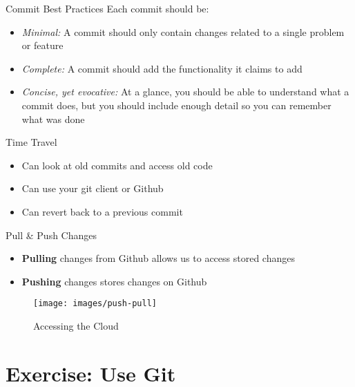 \documentclass[
  ignorenonframetext,
]{beamer}
\providecommand{\tightlist}{%
  \setlength{\itemsep}{0pt}\setlength{\parskip}{0pt}}
\begin{document}
\begin{frame}{Commit Best Practices}
\protect\hypertarget{commit-best-practices}{}
Each commit should be:

\begin{itemize}
\tightlist
\item
  \emph{Minimal:} A commit should only contain changes related to a
  single problem or feature
\item
  \emph{Complete:} A commit should add the functionality it claims to
  add
\item
  \emph{Concise, yet evocative:} At a glance, you should be able to
  understand what a commit does, but you should include enough detail so
  you can remember what was done
\end{itemize}
\end{frame}

\begin{frame}{Time Travel}
\protect\hypertarget{time-travel}{}
\begin{itemize}
\tightlist
\item
  Can look at old commits and access old code
\item
  Can use your git client or Github
\item
  Can revert back to a previous commit
\end{itemize}
\end{frame}

\begin{frame}{Pull \& Push Changes}
\protect\hypertarget{pull-push-changes}{}
\begin{itemize}
\tightlist
\item
  \textbf{Pulling} changes from Github allows us to access stored
  changes
\item
  \textbf{Pushing} changes stores changes on Github
\end{itemize}

\begin{figure}

{\centering \texttt{[image: images/push-pull]} 

}

\caption{Accessing the Cloud}\label{fig:unnamed-chunk-6}
\end{figure}
\end{frame}

\hypertarget{exercise-use-git}{%
\section{Exercise: Use Git}\label{exercise-use-git}}
\end{document}
